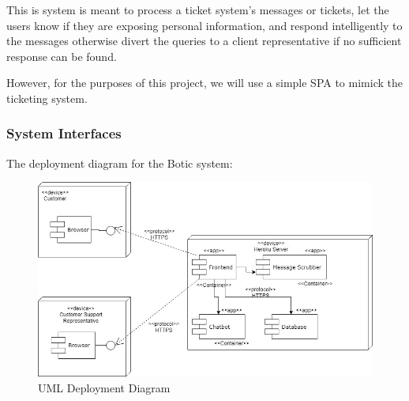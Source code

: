 \documentclass[11pt]{article}
\begin{document}
This is system is meant to process a ticket system's messages or tickets, let the users know if they are exposing personal information, and respond intelligently to the messages otherwise divert the queries to a client representative if no sufficient response can be found.\par

However, for the purposes of this project, we will use a simple SPA to mimick the ticketing system.

\subsubsection{System Interfaces}

The deployment diagram for the Botic system:



\begin{figure}[H]
	\centering
	\includegraphics[width=1.0\textwidth]{../../images/Botic_Deployment_Diagram.jpg}
	\caption{UML Deployment Diagram}
\end{figure}
\end{document}
